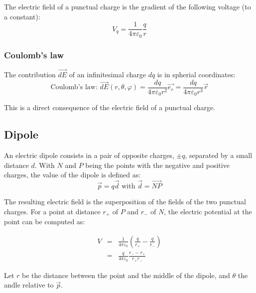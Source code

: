 \documentclass[a4paper,10pt]{article}
\begin{document}
The electric field of a punctual charge is the gradient of the following voltage (to a constant):
\begin{equation}
  V_q = \frac{1}{4 \pi \varepsilon_0} \frac{q}{r}
\end{equation}

\subsubsection{Coulomb's law}

The contribution $\vec{dE}$ of an infinitesimal charge $dq$ is in spherial coordinates:
\begin{equation}
  \text{Coulomb's law: }\vec{dE}(r, \theta, \varphi) = \frac{dq}{4 \pi \varepsilon_0 r^2} \vec{e_r} = \frac{dq}{4 \pi \varepsilon_0 r^3} \vec{r}
\end{equation}

This is a direct consequence of the electric field of a punctual charge.

\subsection{Dipole}

An electric dipole consists in a pair of opposite charges, $\pm q$, separated by a small distance $d$.
With $N$ and $P$ being the points with the negative and positive charges, the value of the dipole is defined as:
\begin{equation}
  \vec{p} = q\vec{d} \text{ with }\vec{d} = \overrightarrow{NP}
\end{equation}

The resulting electric field is the superposition of the fields of the two punctual charges.
For a point at distance $r_+$ of $P$ and $r_-$ of $N$, the electric potential at the point can be computed as:

\begin{eqnarray}
  V &=& \frac{1}{4 \pi \varepsilon_0} \left(\frac{q}{r_+} - \frac{q}{r_-}\right) \\
    &=& \frac{q}{4 \pi \varepsilon_0} \frac{r_- - r_+}{r_+ r_-}
\end{eqnarray}

Let $r$ be the distance between the point and the middle of the dipole, and $\theta$ the andle relative to $\vec{p}$.
\end{document}
